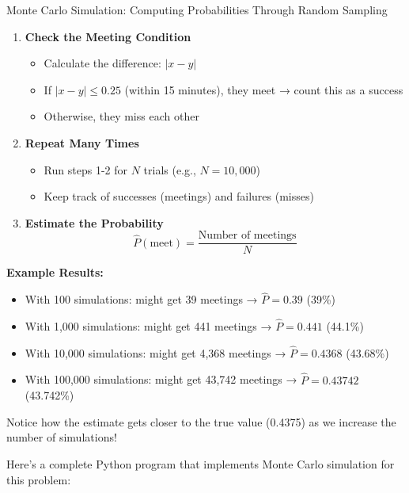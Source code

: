 \begin{keyconceptboxbreak}{Monte Carlo Simulation: Computing Probabilities Through Random Sampling}
\begin{enumerate}
    \item \textbf{Check the Meeting Condition}
    \begin{itemize}
        \item Calculate the difference: $|x - y|$
        \item If $|x - y| \leq 0.25$ (within 15 minutes), they meet → count this as a success
        \item Otherwise, they miss each other
    \end{itemize}

    \item \textbf{Repeat Many Times}
    \begin{itemize}
        \item Run steps 1-2 for $N$ trials (e.g., $N = 10{,}000$)
        \item Keep track of successes (meetings) and failures (misses)
    \end{itemize}

    \item \textbf{Estimate the Probability}
    \[
    \hat{P}(\text{meet}) = \frac{\text{Number of meetings}}{N}
    \]
\end{enumerate}

\textbf{Example Results:}
\begin{itemize}
    \item With 100 simulations: might get 39 meetings → $\hat{P} = 0.39$ (39\%)
    \item With 1,000 simulations: might get 441 meetings → $\hat{P} = 0.441$ (44.1\%)
    \item With 10,000 simulations: might get 4,368 meetings → $\hat{P} = 0.4368$ (43.68\%)
    \item With 100,000 simulations: might get 43,742 meetings → $\hat{P} = 0.43742$ (43.742\%)
\end{itemize}

Notice how the estimate gets closer to the true value (0.4375) as we increase the number of simulations!


Here's a complete Python program that implements Monte Carlo simulation for this problem:

\end{keyconceptboxbreak}

